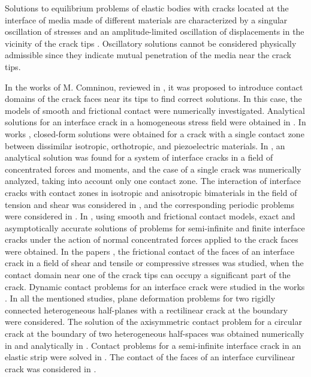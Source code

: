 Solutions to equilibrium problems of elastic bodies with cracks located at the interface of media made of different materials are characterized by a singular oscillation of stresses and an amplitude-limited oscillation of displacements in the vicinity of the crack tips \cite{Ostryk22}. Oscillatory solutions cannot be considered physically admissible since they indicate mutual penetration of the media near the crack tips.

In the works of M. Comninou, reviewed in \cite{Ostryk23}, it was proposed to introduce contact domains of the crack faces near its tips to find correct solutions. In this case, the models of smooth and frictional contact were numerically investigated. Analytical solutions for an interface crack in a homogeneous stress field were obtained in \cite{Ostryk24, Ostryk25}. In works \cite{Ostryk26, Ostryk27, Ostryk28, Ostryk29, Ostryk30}, closed-form solutions were obtained for a crack with a single contact zone between dissimilar isotropic, orthotropic, and piezoelectric materials. In \cite{Ostryk31}, an analytical solution was found for a system of interface cracks in a field of concentrated forces and moments, and the case of a single crack was numerically analyzed, taking into account only one contact zone. The interaction of interface cracks with contact zones in isotropic and anisotropic bimaterials in the field of tension and shear was considered in \cite{Ostryk32,Ostryk33,Ostryk34}, and the corresponding periodic problems were considered in \cite{Ostryk35,Ostryk36,Ostryk37}. In \cite{Ostryk38,Ostryk39,Ostryk40,Ostryk41,Ostryk42,Ostryk43}, using smooth and frictional contact models, exact and asymptotically accurate solutions of problems for semi-infinite and finite interface cracks under the action of normal concentrated forces applied to the crack faces were obtained. In the papers \cite{Ostryk44, Ostryk45, Ostryk46}, the frictional contact of the faces of an interface crack in a field of shear and tensile or compressive stresses was studied, when the contact domain near one of the crack tips can occupy a significant part of the crack. Dynamic contact problems for an interface crack were studied in the works \cite{Ostryk47, Ostryk48, Ostryk49, Ostryk50, Ostryk51, Ostryk52, Ostryk53}. In all the mentioned studies, plane deformation problems for two rigidly connected heterogeneous half-planes with a rectilinear crack at the boundary were considered. The solution of the axisymmetric contact problem for a circular crack at the boundary of two heterogeneous half-spaces was obtained numerically in \cite{Ostryk54, Ostryk55} and analytically in \cite{Ostryk56,Ostryk57,Ostryk58}. Contact problems for a semi-infinite interface crack in an elastic strip were solved in \cite{Ostryk59, Ostryk60, Ostryk61, Ostryk62}. The contact of the faces of an interface curvilinear crack was considered in \cite{Ostryk63, Ostryk64, Ostryk65, Ostryk66, Ostryk67, Ostryk68, Ostryk69, Ostryk70}.

